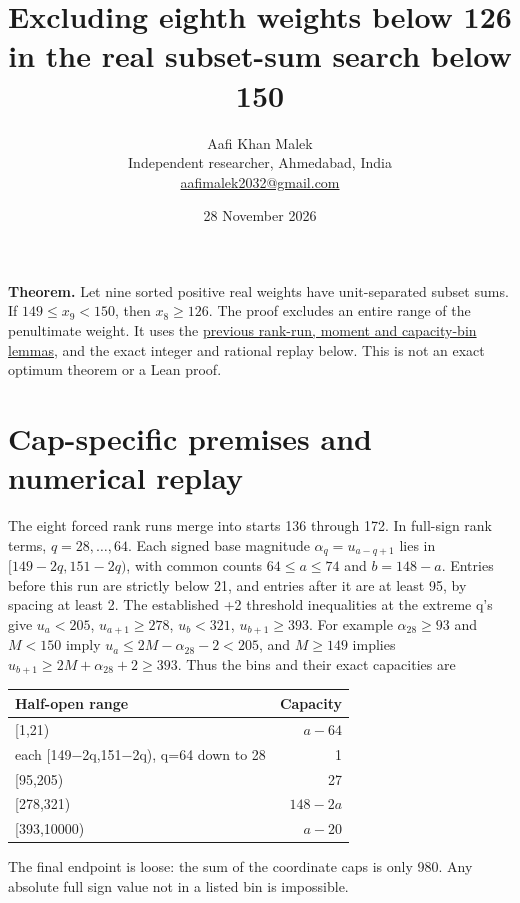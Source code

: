 \documentclass[11pt,letterpaper]{article}
\title{Excluding eighth weights below 126 in the real subset-sum search below 150}
\author{Aafi Khan Malek\\ \small Independent researcher, Ahmedabad, India\\
\small\href{mailto:aafimalek2032@gmail.com}{aafimalek2032@gmail.com}}
\date{28 November 2026}
\begin{document}
\maketitle
\textbf{Theorem.} Let nine sorted positive real weights have
unit-separated subset sums. If \(149\le x_9<150\), then \(x_8\ge126\).
The proof excludes an entire range of the penultimate weight.
It uses the
\href{https://github.com/Aafimalek/novel-discoveries/tree/d70013ae8d7cbe2d52761d2e416ee7422ed12d48/nine-separated-subset-sums/verification/rank-cuts-below-150/penultimate-cap-120}{previous rank-run, moment and capacity-bin lemmas},
and the exact integer and rational replay below. This is not an exact optimum theorem or a Lean proof.

\section{Cap-specific premises and numerical
replay}\label{cap-specific-premises-and-numerical-replay}

The eight forced rank runs merge into starts 136 through 172. In
full-sign rank terms, \(q=28,\ldots,64\). Each signed base magnitude
\(\alpha_q=u_{a-q+1}\) lies in \([149-2q,151-2q)\), with common counts
\(64\le a\le74\) and \(b=148-a\). Entries before this run are strictly
below 21, and entries after it are at least 95, by spacing at least 2.
The established +2 threshold inequalities at the extreme q's give
\(u_a<205\), \(u_{a+1}\ge278\), \(u_b<321\), \(u_{b+1}\ge393\). For
example \(\alpha_{28}\ge93\) and \(M<150\) imply
\(u_a\le 2M-\alpha_{28}-2<205\), and \(M\ge149\) implies
\(u_{b+1}\ge 2M+\alpha_{28}+2\ge393\). Thus the bins and their exact
capacities are

\begin{longtable}[]{@{}lr@{}}
\toprule\noalign{}
Half-open range & Capacity \\
\midrule\noalign{}
\endhead
\bottomrule\noalign{}
\endlastfoot
{[}1,21) & \(a-64\) \\
each {[}149−2q,151−2q), q=64 down to 28 & 1 \\
{[}95,205) & 27 \\
{[}278,321) & \(148-2a\) \\
{[}393,10000) & \(a-20\) \\
\end{longtable}

The final endpoint is loose: the sum of the coordinate caps is only 980.
Any absolute full sign value not in a listed bin is impossible.
\end{document}
